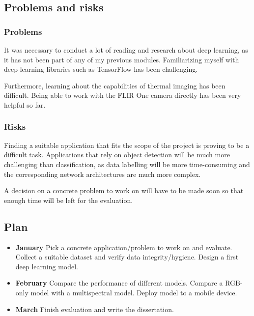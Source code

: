 \documentclass[11pt]{article}
\begin{document}
\subsection{Problems and risks}\label{problems-and-risks}

\subsubsection{Problems}\label{problems}

It was necessary to conduct a lot of reading and research about deep learning, as it has not been part of any of my previous modules. Familiarizing myself with deep learning libraries such as TensorFlow has been challenging.

Furthermore, learning about the capabilities of thermal imaging has been difficult. Being able to work with the FLIR One camera directly has been very helpful so far.

\subsubsection{Risks}\label{risks}

Finding a suitable application that fits the scope of the project is proving to be a difficult task. 
Applications that rely on object detection will be much more challenging than classification, as data labelling will be more time-consuming and the corresponding network architectures are much more complex.

A decision on a concrete problem to work on will have to be made soon so that enough time will be left for the evaluation.

\subsection{Plan}\label{plan}

\begin{itemize}
    \item \textbf{January} Pick a concrete application/problem to work on and evaluate. Collect a suitable dataset and verify data integrity/hygiene. Design a first deep learning model. 
    \item \textbf{February} Compare the performance of different models. Compare a RGB-only model with a multispectral model. Deploy model to a mobile device.
    \item \textbf{March} Finish evaluation and write the dissertation.
\end{itemize}
\end{document}
